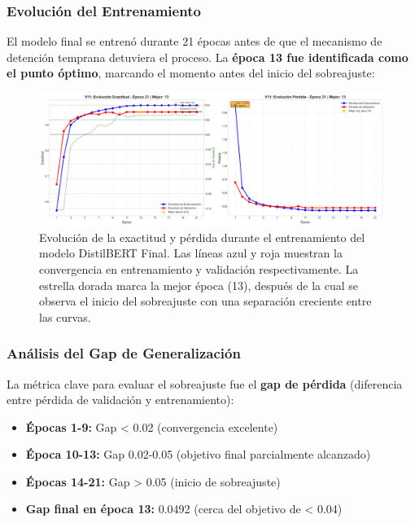 \subsubsection{Evolución del Entrenamiento}

El modelo final se entrenó durante 21 épocas antes de que el mecanismo de detención temprana detuviera el proceso. La \textbf{época 13 fue identificada como el punto óptimo}, marcando el momento antes del inicio del sobreajuste:

\begin{figure}[h!]
    \centering
    \includegraphics[width=\textwidth]{Imagenes/Entrenamiento/curva_aprendizaje_v7.png}
    \caption{Evolución de la exactitud y pérdida durante el entrenamiento del modelo DistilBERT Final. Las líneas azul y roja muestran la convergencia en entrenamiento y validación respectivamente. La estrella dorada marca la mejor época (13), después de la cual se observa el inicio del sobreajuste con una separación creciente entre las curvas.}
    \label{fig:convergencia_distilbert}
\end{figure}

\subsubsection{Análisis del Gap de Generalización}

La métrica clave para evaluar el sobreajuste fue el \textbf{gap de pérdida} (diferencia entre pérdida de validación y entrenamiento):

\begin{itemize}
    \item \textbf{Épocas 1-9:} Gap < 0.02 (convergencia excelente)
    \item \textbf{Época 10-13:} Gap 0.02-0.05 (objetivo final parcialmente alcanzado)
    \item \textbf{Épocas 14-21:} Gap > 0.05 (inicio de sobreajuste)
    \item \textbf{Gap final en época 13:} 0.0492 (cerca del objetivo de < 0.04)
\end{itemize}

